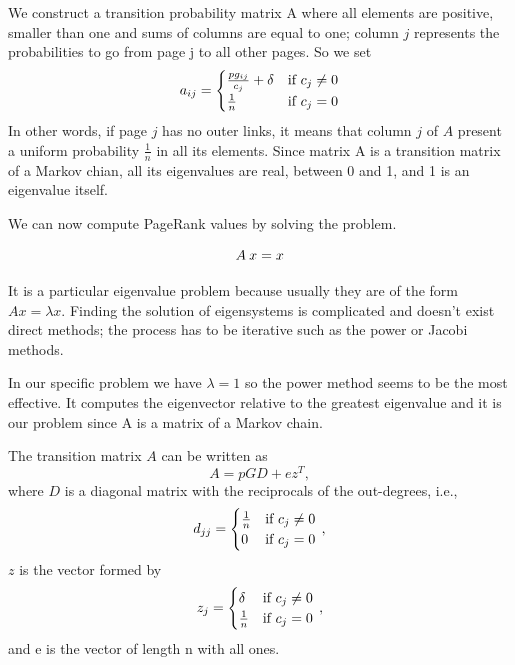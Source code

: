 \documentclass[]{usiinfbachelorproject}
\begin{document}
We construct a transition probability matrix A where all elements are positive, smaller than one and sums of columns are equal to one; column $j$ represents the probabilities to go from page j to all other pages. So we set
\begin{equation}\notag
a_{ij} = 
\begin{cases}
\frac{pg_{ij}}{c_{j}} + \delta  & \text{if } c_{j} \neq 0\\
\frac{1}{n} & \text{if } c_{j} = 0
\end{cases}
\end{equation}
In other words, if page $j$ has no outer links, it means that column $j$ of $A$ present a uniform probability $\frac{1}{n}$ in all its elements. Since matrix A is a transition matrix of a Markov chian, all its eigenvalues are real, between 0 and 1, and 1 is an eigenvalue itself. 

We can now compute PageRank values by solving the problem. 

\begin{equation}\notag
A\:x = x
\end{equation}

It is a particular eigenvalue problem because usually they are of the form $Ax=\lambda x$. Finding the solution of eigensystems is complicated and doesn't exist direct methods; the process has to be iterative such as the power or Jacobi methods.

In our specific problem we have $\lambda = 1$ so the power method seems to be the most effective. It computes the eigenvector relative to the greatest eigenvalue and it is our problem since A is a matrix of a Markov chain.

The transition matrix $A$ can be written as
$$A = pGD+ez^{T}, $$
where $D$ is a diagonal matrix with the reciprocals of the out-degrees, i.e.,
\begin{equation}\notag
d_{jj} = 
\begin{cases}
\frac{1}{n} & \text{if } c_{j} \neq 0\\
0 & \text{if } c_{j} = 0
\end{cases} \,,
\end{equation}
$z$ is the vector formed by
\begin{equation}\notag
z_{j} = 
\begin{cases}
\delta & \text{if } c_{j} \neq 0\\
\frac{1}{n} & \text{if } c_{j} = 0
\end{cases} \,,
\end{equation}
and e is the vector of length n with all ones.
\end{document}
